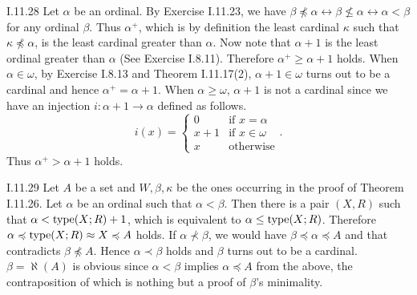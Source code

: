 \documentclass[12pt]{article}
\begin{document}
\begin{customthm}{I.11.28}
  Let $\alpha$ be an ordinal. By Exercise I.11.23, we have $\beta\not\preccurlyeq\alpha\leftrightarrow\beta\not\leq\alpha\leftrightarrow\alpha<\beta$ for any ordinal $\beta$. Thus $\alpha^+$, which is by definition the least cardinal $\kappa$ such that $\kappa\not\preccurlyeq\alpha$, is the least cardinal greater than $\alpha$. Now note that $\alpha+1$ is the least ordinal greater than $\alpha$ (See Exercise I.8.11). Therefore $\alpha^+\geq\alpha+1$ holds. When $\alpha\in\omega$, by Exercise I.8.13 and Theorem I.11.17(2), $\alpha+1\in\omega$ turns out to be a cardinal and hence $\alpha^+=\alpha+1$. When $\alpha\geq\omega$, $\alpha+1$ is not a cardinal since we have an injection $i:\alpha+1\rightarrow\alpha$ defined as follows.
  \[
    i(x)=
    \begin{cases}
      0 & \text{if } x=\alpha \\
      x+1 & \text{if } x\in\omega \\
      x & \text{otherwise}
    \end{cases}.
  \]
  Thus $\alpha^+>\alpha+1$ holds.
\end{customthm}

\begin{customthm}{I.11.29}
  Let $A$ be a set and $W,\beta,\kappa$ be the ones occurring in the proof of Theorem I.11.26. Let $\alpha$ be an ordinal such that $\alpha<\beta$. Then there is a pair $(X,R)$ such that $\alpha<\mathop{\mathrm{type}}(X;R)+1$, which is equivalent to $\alpha\leq\mathop{\mathrm{type}}(X;R)$. Therefore $\alpha\preccurlyeq\mathop{\mathrm{type}}(X;R)\approx X\preccurlyeq A$ holds. If $\alpha\not\prec\beta$, we would have $\beta\preccurlyeq\alpha\preccurlyeq A$ and that contradicts $\beta\not\preccurlyeq A$. Hence $\alpha\prec\beta$ holds and $\beta$ turns out to be a cardinal. $\beta=\aleph(A)$ is obvious since $\alpha<\beta$ implies $\alpha\preccurlyeq A$ from the above, the contraposition of which is nothing but a proof of $\beta$'s minimality.
\end{customthm}
\end{document}

